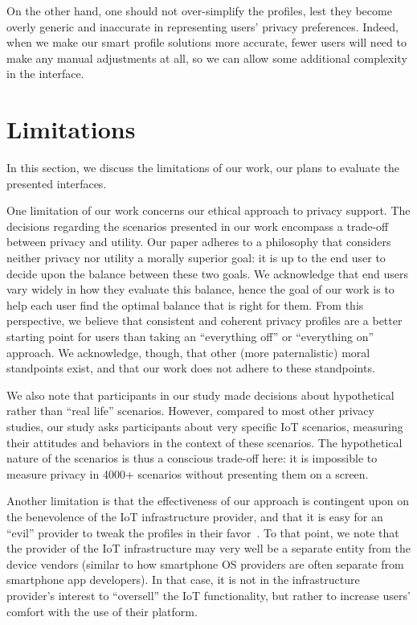 On the other hand, one should not over-simplify the profiles, lest they become overly generic and inaccurate in representing users' privacy preferences. Indeed, when we make our smart profile solutions more accurate, fewer users will need to make any manual adjustments at all, so we can allow some additional complexity in the interface.

\section{Limitations}\label{sec:future_work}

In this section, we discuss the limitations of our work, our plans to evaluate the presented interfaces.

One limitation of our work concerns our ethical approach to privacy support. The decisions regarding the scenarios presented in our work encompass a trade-off between privacy and utility. Our paper adheres to a philosophy that considers neither privacy nor utility a morally superior goal: it is up to the end user to decide upon the balance between these two goals. We acknowledge that end users vary widely in how they evaluate this balance, hence the goal of our work is to help each user find the optimal balance that is right for them. From this perspective, we believe that consistent and coherent privacy profiles are a better starting point for users than taking an ``everything off'' or ``everything on'' approach. We acknowledge, though, that other (more paternalistic) moral standpoints exist, and that our work does not adhere to these standpoints.

We also note that participants in our study made decisions about hypothetical rather than ``real life'' scenarios. However, compared to most other privacy studies, our study asks participants about very specific IoT scenarios, measuring their attitudes and behaviors in the context of these scenarios. The hypothetical nature of the scenarios is thus a conscious trade-off here: it is impossible to measure privacy in 4000+ scenarios without presenting them on a screen.

Another limitation is that the effectiveness of our approach is contingent upon on the benevolence of the IoT infrastructure provider, and that it is easy for an ``evil'' provider to tweak the profiles in their favor~\cite{knijnenburg2013}. To that point, we note that the provider of the IoT infrastructure may very well be a separate entity from the device vendors (similar to how smartphone OS providers are often separate from smartphone app developers). In that case, it is not in the infrastructure provider's interest to ``oversell'' the IoT functionality, but rather to increase users' comfort with the use of their platform.

